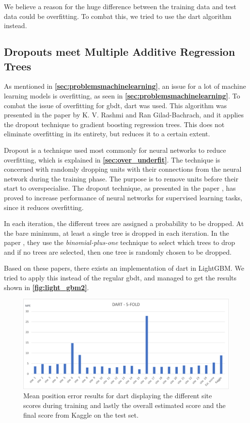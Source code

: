We believe a reason for the huge difference between the training data and test data could be overfitting. To combat this, we tried to use the \gls{dart} algorithm instead.

\subsection{Dropouts meet Multiple Additive Regression Trees}

As mentioned in \textbf{\autoref{sec:problemsmachinelearning}}, an issue for a lot of machine learning models is overfitting, as seen in \textbf{\autoref{sec:problemsmachinelearning}}. To combat the issue of overfitting for \gls{gbdt}, \gls{dart} was used. This algorithm was presented in the paper \cite{dart} by K. V. Rashmi and Ran Gilad-Bachrach, and it applies the dropout technique to gradient boosting regression trees. This does not eliminate overfitting in its entirety, but reduces it to a certain extent.\cite{dart}

Dropout is a technique used most commonly for neural networks to reduce overfitting, which is explained in \textbf{\autoref{sec:over_underfit}}. The technique is concerned with randomly dropping units with their connections from the neural network during the training phase. The purpose is to remove units before their start to overspecialise. The dropout technique, as presented in the paper \cite{dropout}, has proved to increase performance of neural networks for supervised learning tasks, since it reduces overfitting.

In each iteration, the different trees are assigned a probability to be dropped. At the bare minimum, at least a single tree is dropped in each iteration. In the paper \cite{dart}, they use the \textit{binomial-plus-one} technique to select which trees to drop and if no trees are selected, then one tree is randomly chosen to be dropped.

Based on these papers, there exists an implementation of \gls{dart} in LightGBM. We tried to apply this instead of the regular \gls{gbdt}, and managed to get the results shown in \textbf{\autoref{fig:light_gbm2}}.

\begin{figure}[H]
    \centering
    \includegraphics[scale=0.6]{Images/Experiments/lightgbm/DART_5.png}
    \caption{Mean position error results for \gls{dart} displaying the different site scores during training and lastly the overall estimated score and the final score from Kaggle on the test set.}
    \label{fig:light_gbm2}
\end{figure}

